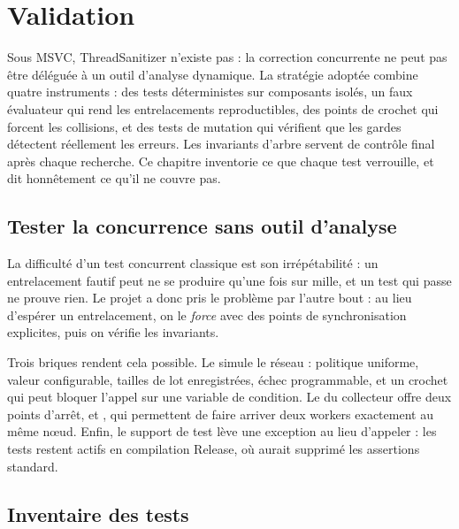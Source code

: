 \section{Validation}
\label{sec:validation}

\begin{resume}
Sous MSVC, ThreadSanitizer n'existe pas : la correction concurrente ne peut
pas \^etre d\'el\'egu\'ee \`a un outil d'analyse dynamique. La strat\'egie
adopt\'ee combine quatre instruments : des tests d\'eterministes sur
composants isol\'es, un faux \'evaluateur qui rend les entrelacements
reproductibles, des points de crochet qui forcent les collisions, et des
tests de mutation qui v\'erifient que les gardes d\'etectent r\'eellement les
erreurs. Les invariants d'arbre servent de contr\^ole final apr\`es chaque
recherche. Ce chapitre inventorie ce que chaque test verrouille, et dit
honn\^etement ce qu'il ne couvre pas.
\end{resume}

\subsection{Tester la concurrence sans outil d'analyse}

La difficult\'e d'un test concurrent classique est son irr\'ep\'etabilit\'e :
un entrelacement fautif peut ne se produire qu'une fois sur mille, et un
test qui passe ne prouve rien. Le projet a donc pris le probl\`eme par
l'autre bout : au lieu d'esp\'erer un entrelacement, on le \emph{force} avec
des points de synchronisation explicites, puis on v\'erifie les invariants.

Trois briques rendent cela possible. Le  simule le
r\'eseau : politique uniforme, valeur configurable, tailles de lot
enregistr\'ees, \'echec programmable, et un crochet 
qui peut bloquer l'appel sur une variable de condition. Le
 du collecteur offre deux points d'arr\^et,
 et , qui permettent de faire
arriver deux workers exactement au m\^eme n\oe{}ud. Enfin, le support de test
 l\`eve une exception au lieu d'appeler  :
les tests restent actifs en compilation Release, o\`u  aurait
supprim\'e les assertions standard.

\subsection{Inventaire des tests}

